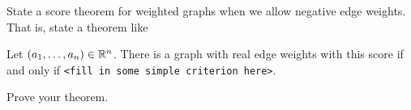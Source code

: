 
\begin{exercise}
  State a score theorem for weighted graphs when we allow
  negative edge weights. That is, state a theorem like
  \begin{theorem}
     Let $(a_1,\dots,a_n) \in \mathbb{R}^n$. There is a  graph with real edge weights
     with this score if and only if \texttt{\textup{<fill in some simple criterion here>}}.
  \end{theorem}  
\end{exercise}

\begin{exercise}
Prove your theorem.
\end{exercise}

